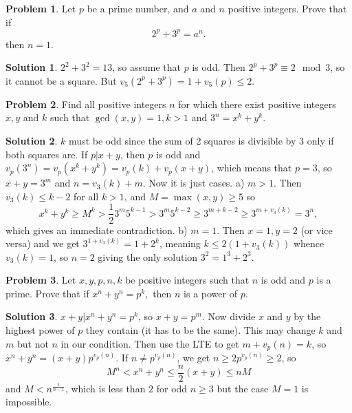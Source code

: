 \documentclass{article}
\theoremstyle{definition}
\newtheorem{problem}{Problem}
\newtheorem*{solution}{Solution}
\begin{document}


\begin{problem}
Let $p$ be a prime number, and $a$ and $n$ positive integers. Prove that if
$$2^p+3^p=a^n.$$
then $n=1.$
\end{problem}

\begin{solution}
$2^2+3^2=13$, so assume that $p$ is odd. Then $2^p+3^p\equiv 2\mod 3$, so it cannot be a square. But $v_5(2^p+3^p)=1+v_5(p)\le 2$.
\end{solution}


\begin{problem}
Find all positive integers $n$ for which there exist positive integers $x ,y$ and $k$ such that $\gcd(x,y)=1, k>1$ and $3^n = x^k + y^k.$
\end{problem}

\begin{solution}
$k$ must be odd since the sum of 2 squares is divisible by $3$ only if both squares are. If $p|x+y$, then $p$ is odd and $v_p(3^n)=v_p(x^k+y^k)=v_p(k)+v_p(x+y)$, which means that $p=3$, so $x+y=3^m$ and $n=v_3(k)+m$. Now it is just cases.
a) $m>1$. Then $v_3(k)\le k-2$ for all $k>1$, and $M=\max(x,y)\ge 5$ so
$$x^k+y^k\ge M^k> \frac 12 3^m 5^{k-1}> 3^m5^{k-2}\ge 3^{m+k-2}\ge 3^{m+v_3(k)}=3^n,$$
which gives an immediate contradiction.
b) $m=1$. Then $x=1,y=2$ (or vice versa) and we get $3^{1+v_3(k)}=1+2^k$, meaning $k\le 2(1+v_3(k))$ whence $v_3(k)=1$, so $n=2$ giving the only solution $3^2=1^3+2^3$.
\end{solution}

\begin{problem}
Let $x,y,p,n,k$ be positive integers such that $n$ is odd and $p$ is a prime. Prove that if $x^n+y^n=p^k,$ then $n$ is a power of $p.$
\end{problem}

\begin{solution}
$x+y|x^n+y^n=p^k$, so $x+y=p^m$. Now divide $x$ and $y$ by the highest power of $p$ they contain (it has to be the same). This may change $k$ and $m$ but not $n$ in our condition. Then use the LTE to get $m+v_p(n)=k$, so $x^n+y^n=(x+y)p^{v_p(n)}$. If $n\ne p^{v_p(n)}$, we get $n\ge 2p^{v_p(n)}\ge 2$, so $$M^n < x^n+y^n\le \frac n2(x+y)\le nM$$ and $M < n^{\frac 1{n-1}}$, which is less than $2$ for odd $n\ge 3$ but the case $M=1$ is impossible.
\end{solution}
\end{document}
